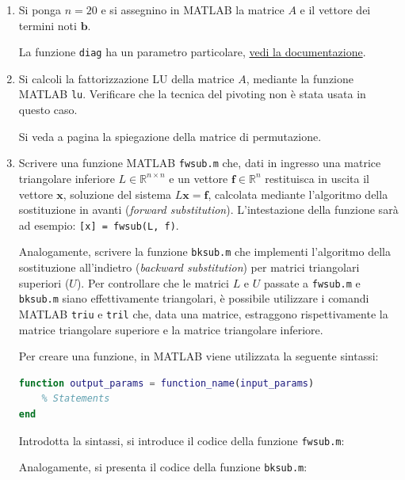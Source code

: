\begin{enumerate}
    \item Si ponga $n=20$ e si assegnino in MATLAB la matrice $A$ e il vettore dei termini noti $\mathbf{b}$.
    
    La funzione \texttt{diag} ha un parametro particolare, \href{https://www.mathworks.com/help/releases/R2024a/matlab/ref/diag.html#bt79o5i-1-k}{vedi la documentazione}.

    
    \item Si calcoli la fattorizzazione LU della matrice $A$, mediante la funzione MATLAB \texttt{lu}. Verificare che la tecnica del pivoting non è stata usata in questo caso.
    
    Si veda a pagina \pageref{eq: pivoting} la spiegazione della matrice di permutazione.


    \newpage


    \item Scrivere una funzione MATLAB \texttt{fwsub.m} che, dati in ingresso una matrice triangolare inferiore $L \in \mathbb{R}^{n \times n}$ e un vettore $\mathbf{f} \in \mathbb{R}^{n}$ restituisca in uscita il vettore $\mathbf{x}$, soluzione del sistema $L \mathbf{x} = \mathbf{f}$, calcolata mediante l'algoritmo della sostituzione in avanti (\emph{forward substitution}). L'intestazione della funzione sarà ad esempio: \texttt{[x] = fwsub(L, f)}.

    Analogamente, scrivere la funzione \texttt{bksub.m} che implementi l'algoritmo della sostituzione all'indietro (\emph{backward substitution}) per matrici triangolari superiori ($U$). Per controllare che le matrici $L$ e $U$ passate a \texttt{fwsub.m} e \texttt{bksub.m} siano effettivamente triangolari, è possibile utilizzare i comandi MATLAB \texttt{triu} e \texttt{tril} che, data una matrice, estraggono rispettivamente la matrice triangolare superiore e la matrice triangolare inferiore.

    Per creare una funzione, in MATLAB viene utilizzata la seguente sintassi:
\begin{lstlisting}[language=MATLAB]
function output_params = function_name(input_params)
    % Statements
end\end{lstlisting}
    Introdotta la sintassi, si introduce il codice della funzione \texttt{fwsub.m}:
    
    Analogamente, si presenta il codice della funzione \texttt{bksub.m}:
    


\end{enumerate}
